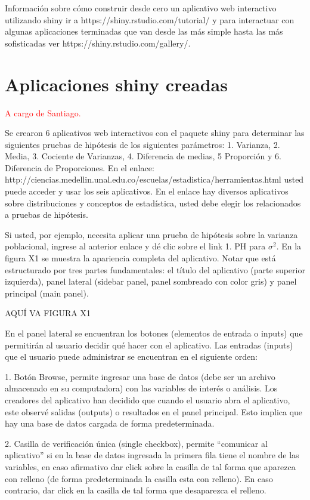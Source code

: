 \documentclass[]{comunicaciones}
\newcommand{\pkg}[1]{{\normalfont\fontseries{b}\selectfont #1}}
\begin{document}
Información sobre cómo construir desde cero un aplicativo web interactivo utilizando shiny ir a https://shiny.rstudio.com/tutorial/ y para interactuar con algunas aplicaciones terminadas que van desde las más simple hasta las más sofisticadas ver https://shiny.rstudio.com/gallery/.

\section{Aplicaciones \pkg{shiny} creadas}
\textcolor{red}{A cargo de Santiago.}

Se crearon 6 aplicativos web interactivos con el paquete shiny para determinar las siguientes pruebas de hipótesis de los siguientes parámetros: 1. Varianza, 2. Media, 3. Cociente de Varianzas, 4. Diferencia de medias, 5 Proporción y 6. Diferencia de Proporciones. En el enlace: http://ciencias.medellin.unal.edu.co/escuelas/estadistica/herramientas.html usted puede acceder y usar los seis aplicativos. En el enlace hay diversos aplicativos sobre distribuciones y conceptos de estadística, usted debe elegir los relacionados a pruebas de hipótesis.

Si usted, por ejemplo,  necesita aplicar una prueba de hipótesis sobre la varianza poblacional, ingrese al anterior enlace y dé clic sobre el link 1. PH para $\sigma^2$. En la figura X1 se muestra la apariencia completa del aplicativo. Notar que está estructurado por tres partes fundamentales: el título del aplicativo (parte superior izquierda), panel lateral (sidebar panel, panel sombreado con color gris) y panel principal (main panel).

AQUÍ VA FIGURA X1

En el panel lateral se encuentran los botones (elementos de entrada o inputs) que permitirán al usuario decidir qué hacer con el aplicativo. Las entradas (inputs) que el usuario puede administrar se encuentran en el siguiente orden:

1.	Botón Browse, permite ingresar una base de datos (debe ser un archivo almacenado en su computadora) con las variables de interés o análisis. Los creadores del aplicativo han decidido que cuando el usuario abra el aplicativo, este observé salidas (outputs) o resultados en el panel principal. Esto implica que hay una base de datos cargada de forma predeterminada.

2.	Casilla de verificación única (single checkbox), permite “comunicar al aplicativo” si en la base de datos ingresada la primera fila tiene el nombre de las variables, en caso afirmativo dar click sobre la casilla de tal forma que aparezca con relleno (de forma predeterminada la casilla esta con relleno). En caso contrario, dar click en la casilla de tal forma que desaparezca el relleno.
\end{document}

